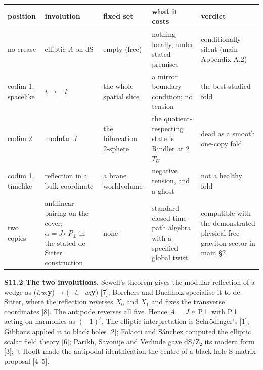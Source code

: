 \documentclass[
]{article}
\newcounter{none} %
\begin{document}
{\def\LTcaptype{none} %
\begin{longtable}[]{@{}
  >{\raggedright\arraybackslash}p{}
  >{\raggedright\arraybackslash}p{}
  >{\raggedright\arraybackslash}p{}
  >{\raggedright\arraybackslash}p{}
  >{\raggedright\arraybackslash}p{}@{}}
\toprule\noalign{}
\begin{minipage}[b]{\linewidth}\raggedright
position
\end{minipage} & \begin{minipage}[b]{\linewidth}\raggedright
involution
\end{minipage} & \begin{minipage}[b]{\linewidth}\raggedright
fixed set
\end{minipage} & \begin{minipage}[b]{\linewidth}\raggedright
what it costs
\end{minipage} & \begin{minipage}[b]{\linewidth}\raggedright
verdict
\end{minipage} \\
\midrule\noalign{}
\endhead
\bottomrule\noalign{}
\endlastfoot
no crease & elliptic \emph{A} on dS & empty (free) & nothing locally,
under stated premises & conditionally silent (main Appendix A.2) \\
codim 1, spacelike & \emph{t} → −\emph{t} & the whole spatial slice & a
mirror boundary condition; no tension & the best-studied fold \\
codim 2 & modular \emph{J} & the bifurcation 2-sphere & the
quotient-respecting state is Rindler at 2\(T_{U}\) & dead as a smooth
one-copy fold \\
codim 1, timelike & reflection in a bulk coordinate & a brane
worldvolume & negative tension, and a ghost & not a healthy fold \\
two copies & antilinear pairing on the cover; \(\alpha=J\circ P_\perp\)
in the stated de Sitter construction & none & standard closed-time-path
algebra with a specified global twist & compatible with the demonstrated
physical free-graviton sector in main §2 \\
\end{longtable}
}

\textbf{S11.2 The two involutions.} Sewell's theorem gives the modular
reflection of a wedge as (\emph{t},\emph{w};\textbf{y}) →
(−\emph{t},−\emph{w};\textbf{y}) {[}7{]}; Borchers and Buchholz
specialise it to de Sitter, where the reflection reverses \(X_0\) and
\(X_1\) and fixes the transverse coordinates {[}8{]}. The antipode
reverses all five. Hence \emph{A} = \emph{J} ∘ P⊥ with P⊥ acting on
harmonics as \((-1)^\ell\). The elliptic interpretation is Schrödinger's
{[}1{]}; Gibbons applied it to black holes {[}2{]}; Folacci and Sánchez
computed the elliptic scalar field theory {[}6{]}; Parikh, Savonije and
Verlinde gave dS/Z₂ its modern form {[}3{]}; 't Hooft made the antipodal
identification the centre of a black-hole S-matrix proposal {[}4--5{]}.
\end{document}
